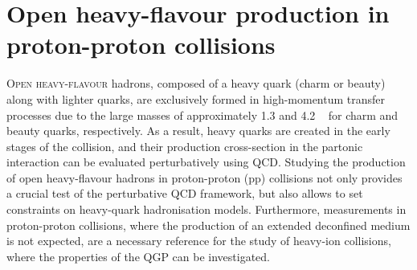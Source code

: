 \chapter{Open heavy-flavour production in proton-proton collisions}

\lettrine[lines=6,findent=0.pt]{O}{pen heavy-flavour} hadrons, composed of a heavy quark (charm or beauty) along with lighter quarks, are exclusively formed in high-momentum transfer processes due to the large masses of approximately 1.3 \gevcc and 4.2 \gevcc~\cite{pdg} for charm and beauty quarks, respectively. As a result, heavy quarks are created in the early stages of the collision, and their production cross-section in the partonic interaction can be evaluated perturbatively using QCD. Studying the production of open heavy-flavour hadrons in proton-proton (pp) collisions not only provides a crucial test of the perturbative QCD framework, but also allows to set constraints on heavy-quark hadronisation models. Furthermore, measurements in proton-proton collisions, where the production of an extended deconfined medium is not expected, are a necessary reference for the study of heavy-ion collisions, where the properties of the QGP can be investigated. 

